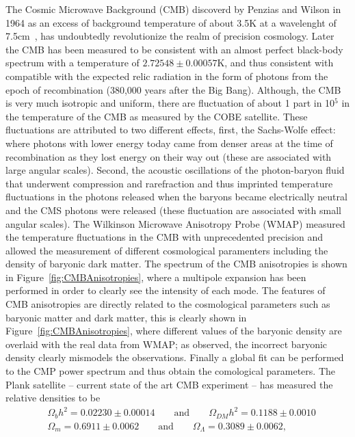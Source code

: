 The Cosmic Microwave Background (CMB) discoverd by Penzias and Wilson
in 1964 as an excess of background temperature of about 3.5\unit{K} at a
wavelenght of 7.5\unit{cm}~\cite{CMBDiscovery}, has undoubtedly
revolutionize the realm of precision cosmology. Later the CMB
has been measured to be consistent with an almost perfect black-body
spectrum with a temperature of  $2.72548\pm0.00057$\unit{K}, and thus
consistent with compatible with the expected relic radiation in the
form of photons from the epoch of recombination (380,000 years after
the Big Bang). Although, the CMB is very much isotropic and uniform, there are
fluctuation of about 1 part in 10$^{5}$ in the temperature of the CMB
as measured by the COBE satellite. These fluctuations are attributed
to two different effects, first, the Sachs-Wolfe effect: where photons
with lower energy today came from denser areas at the time of
recombination as they lost energy on their way out (these are
associated with large angular scales). Second, the acoustic
oscillations of the photon-baryon fluid that underwent compression and
rarefraction and thus imprinted temperature fluctuations in the
photons released when the baryons became electrically neutral and the
CMS photons were released (these fluctuation are associated with small
angular scales). The Wilkinson Microwave Anisotropy Probe (WMAP)
measured the temperature fluctuations in the CMB with unprecedented
precision and allowed the measurement of different cosmological
paramenters including the density of baryonic dark matter. The
spectrum of the CMB anisotropies is shown in
Figure~\ref{fig:CMBAnisotropies}, where a multipole expansion has been
performed in order to clearly see the intensity of each mode. The
features of CMB anisotropies are directly related to the cosmological
parameters such as baryonic matter and dark matter, this is clearly
shown in Figure~\ref{fig:CMBAnisotropies}, where different values of
the baryonic density are overlaid with the real data from WMAP; as
observed, the incorrect baryonic density clearly mismodels the
observations. Finally a global fit can be performed to the CMP power
spectrum and thus obtain the comological parameters. The Plank
satellite -- current state of the art CMB experiment --  has measured
the  relative densities to be~\cite{plank}
\begin{equation}
\label{eq:plank}
\begin{aligned}
       &\Omega_{b}h^{2} = 0.02230\pm0.00014
        \qquad \text{and}  \qquad  \Omega_{DM}h^{2} = 0.1188\pm0.0010\\
        &\Omega_{m}= 0.6911\pm0.0062
        \qquad \text{and}  \qquad  \Omega_{\Lambda} = 0.3089\pm0.0062,
       \end{aligned}
\end{equation}

